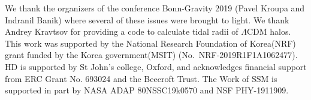 \documentclass[twocolumn,tighten]{aastex63}
\begin{document}
\acknowledgements
We thank the organizers of the conference Bonn-Gravity 2019 (Pavel Kroupa and Indranil Banik) where several of these issues were brought to light. We thank Andrey Kravtsov for providing a code to calculate tidal radii of $\Lambda$CDM halos.
This work was supported by the National Research Foundation of Korea(NRF) grant funded by the Korea government(MSIT) (No.\ NRF-2019R1F1A1062477). HD is supported by St John's college, Oxford, and acknowledges financial support from ERC Grant No. 693024 and the Beecroft Trust. The Work of SSM is supported in part by NASA ADAP 80NSSC19k0570 and NSF PHY-1911909.
  

\end{document}
